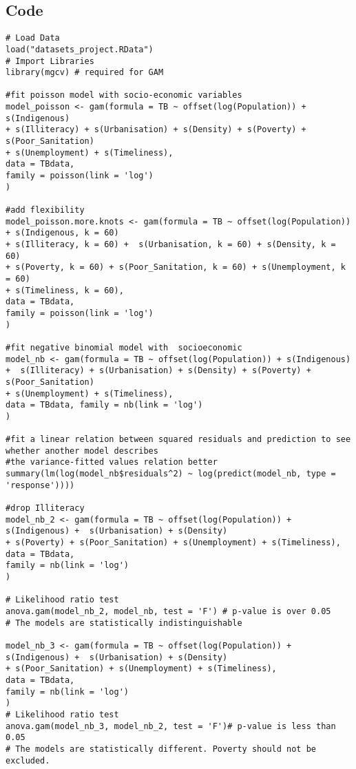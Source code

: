 \subsection{Code}
\begin{verbatim}
# Load Data
load("datasets_project.RData")
# Import Libraries
library(mgcv) # required for GAM 

#fit poisson model with socio-economic variables
model_poisson <- gam(formula = TB ~ offset(log(Population)) + s(Indigenous)
+ s(Illiteracy) + s(Urbanisation) + s(Density) + s(Poverty) + s(Poor_Sanitation)
+ s(Unemployment) + s(Timeliness), 
data = TBdata, 
family = poisson(link = 'log')
)

#add flexibility
model_poisson.more.knots <- gam(formula = TB ~ offset(log(Population)) + s(Indigenous, k = 60) 
+ s(Illiteracy, k = 60) +  s(Urbanisation, k = 60) + s(Density, k = 60) 
+ s(Poverty, k = 60) + s(Poor_Sanitation, k = 60) + s(Unemployment, k = 60) 
+ s(Timeliness, k = 60), 
data = TBdata, 
family = poisson(link = 'log')
)

#fit negative binomial model with  socioeconomic
model_nb <- gam(formula = TB ~ offset(log(Population)) + s(Indigenous) 
+  s(Illiteracy) + s(Urbanisation) + s(Density) + s(Poverty) + s(Poor_Sanitation)
+ s(Unemployment) + s(Timeliness), 
data = TBdata, family = nb(link = 'log')
)

#fit a linear relation between squared residuals and prediction to see whether another model describes
#the variance-fitted values relation better
summary(lm(log(model_nb$residuals^2) ~ log(predict(model_nb, type = 'response'))))

#drop Illiteracy
model_nb_2 <- gam(formula = TB ~ offset(log(Population)) + s(Indigenous) +  s(Urbanisation) + s(Density) 
+ s(Poverty) + s(Poor_Sanitation) + s(Unemployment) + s(Timeliness),
data = TBdata,
family = nb(link = 'log')
)

# Likelihood ratio test
anova.gam(model_nb_2, model_nb, test = 'F') # p-value is over 0.05
# The models are statistically indistinguishable

model_nb_3 <- gam(formula = TB ~ offset(log(Population)) + s(Indigenous) +  s(Urbanisation) + s(Density) 
+ s(Poor_Sanitation) + s(Unemployment) + s(Timeliness), 
data = TBdata, 
family = nb(link = 'log')
)
# Likelihood ratio test
anova.gam(model_nb_3, model_nb_2, test = 'F')# p-value is less than 0.05
# The models are statistically different. Poverty should not be excluded.


\end{verbatim}
